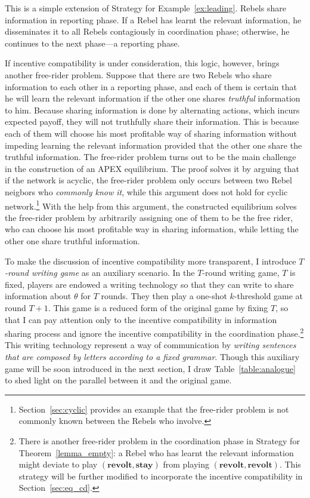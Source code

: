 \documentclass[12pt,letter]{article}
\theoremstyle{definition}
\theoremstyle{remark}
\theoremstyle{claim}
\begin{document}
This is a simple extension of Strategy for Example~\ref{ex:leading}. Rebels share information in reporting phase. If a Rebel has learnt the relevant information, he disseminates it to all Rebels contagiously in coordination phase; otherwise, he continues to the next phase---a reporting phase. 

If incentive compatibility is under consideration, this logic, however, brings another free-rider problem. Suppose that there are two Rebels who share information to each other in a reporting phase, and each of them is certain that he will learn the relevant information if the other one shares \textit{truthful} information to him. Because sharing information is done by alternating actions, which incurs expected payoff, they will not truthfully share their information. This is because each of them will choose his most profitable way of sharing information without impeding learning the relevant information provided that the other one share the truthful information. The free-rider problem turns out to be the main challenge in the construction of an APEX equilibrium. The proof solves it by arguing that if the network is acyclic, the free-rider problem only occurs between two Rebel neigbors who \textit{commonly know it}, while this argument does not hold for cyclic network.\footnote{Section~\ref{sec:cyclic} provides an example that the free-rider problem is not commonly known between the Rebels who involve.} 
With the help from this argument, the constructed equilibrium solves the free-rider problem by arbitrarily assigning one of them to be the {free rider}, who can choose his most profitable way in sharing information, while letting the other one share truthful information. 

To make the discussion of incentive compatibility more transparent, I introduce \textit{$T$-round writing game} as an auxiliary scenario. In the $T$-round writing game, $T$ is fixed, players are endowed a writing technology so that they can write to share information about $\theta$ for $T$ rounds. They then play a one-shot $k$-threshold game at round $T+1$. This game is a reduced form of the original game by fixing $T$, so that I can pay attention only to the incentive compatibility in information sharing process and ignore the incentive compatibility in the coordination phase.\footnote{There is another free-rider problem in the coordination phase in Strategy for Theorem~\ref{lemma_empty}: a Rebel who has learnt the relevant information might deviate to play $(\textbf{revolt},\textbf{stay})$ from playing $(\textbf{revolt},\textbf{revolt})$. This strategy will be further modified to incorporate the incentive compatibility in Section~\ref{sec:eq_cd}.} 
This writing technology represent a way of communication by \textit{writing sentences that are composed by letters according to a fixed grammar}. Though this auxiliary game will be soon introduced in the next section, I draw Table~\ref{table:analogue} to shed light on the parallel between it and the original game.
\end{document}
